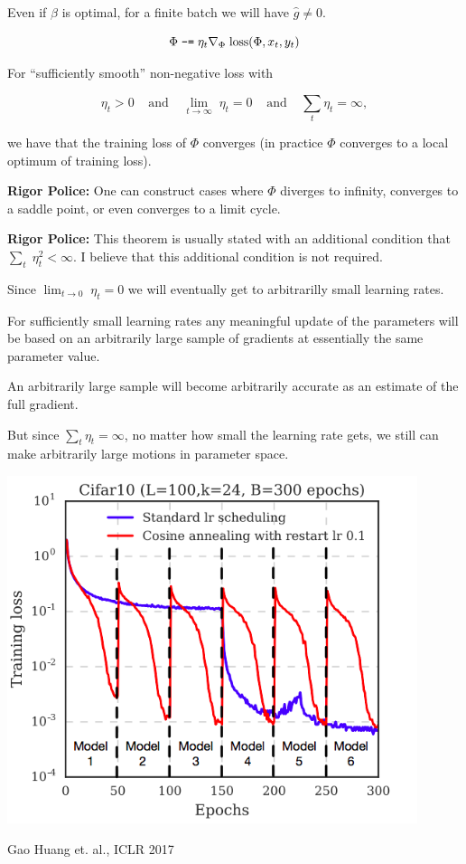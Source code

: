 {\vfill
Even if $\beta$ is optimal, for a finite batch we will have $\hat{g} \not = 0$.


$$\Phi \;\mbox{\tt -=} \; \eta_t \nabla_\Phi\;\mathrm{loss}(\Phi,x_t,y_t)$$

\vfill
For ``sufficiently smooth'' non-negative loss with

\vfill
$$\eta_t > 0\;\;\;\;\mbox{and}\;\;\;\;\lim_{t \rightarrow \infty} \;\eta_t = 0\;\;\;\;\mbox{and}\;\;\;\;\sum_t \eta_t = \infty,$$

\vfill
we have that the training loss of $\Phi$ converges (in practice $\Phi$ converges to a local optimum of training loss).

\vfill
{\Large
\vfill
{\bf Rigor Police:} One can construct cases where $\Phi$ diverges to infinity, converges to a saddle point, or even converges to a limit cycle.

\vfill
{\bf Rigor Police:} This theorem is usually stated with an additional condition that $\sum_t \;\eta_t^2 < \infty$.  I believe that this additional condition is not required.

}


Since $\lim_{t \rightarrow 0} \;\eta_t = 0$ we will eventually get to arbitrarilly small learning rates.

\vfill
For sufficiently small learning rates any meaningful update of the parameters will be based on an arbitrarily large sample
of gradients at essentially the same parameter value.

\vfill
An arbitrarily large sample will become arbitrarily accurate as an estimate of the full gradient.

\vfill
But since $\sum_t \eta_t = \infty$, no matter how small the learning rate gets, we still can make arbitrarily large motions in parameter space.


\centerline{\includegraphics[height= 4in]{../images/AnnealingSGD}}
\centerline{\Large Gao Huang et. al., ICLR 2017}

}
